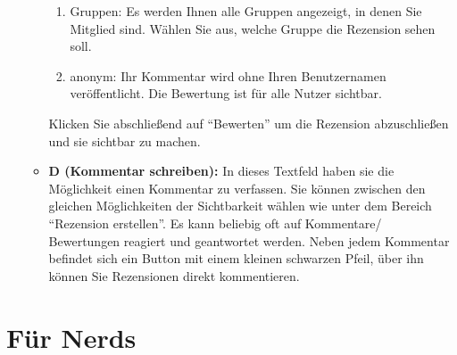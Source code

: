 \documentclass[a4paper,11pt,twoside]{scrbook}
\begin{document}
\begin{enumerate}
\begin{itemize}
\begin{enumerate}
            \item Gruppen: Es werden Ihnen alle Gruppen angezeigt, in denen Sie Mitglied sind. Wählen Sie aus, welche Gruppe die Rezension sehen soll.
            \item anonym: Ihr Kommentar wird ohne Ihren Benutzernamen veröffentlicht. Die Bewertung ist für alle Nutzer sichtbar.
        \end{enumerate}
       	Klicken Sie abschließend auf \enquote{Bewerten} um die Rezension abzuschließen und sie sichtbar zu machen.
        \item \textbf{D (Kommentar schreiben):} In dieses Textfeld haben sie die Möglichkeit einen Kommentar zu verfassen. Sie können zwischen den gleichen Möglichkeiten der Sichtbarkeit wählen wie unter dem Bereich \enquote{Rezension erstellen}.
\newline Es kann beliebig oft auf Kommentare/ Bewertungen  reagiert und geantwortet werden. Neben jedem Kommentar befindet sich ein Button mit einem kleinen schwarzen Pfeil, über ihn können Sie Rezensionen direkt kommentieren. 
    \end{itemize}
\end{enumerate}




\newpage
\section{Für Nerds}
\end{document}
